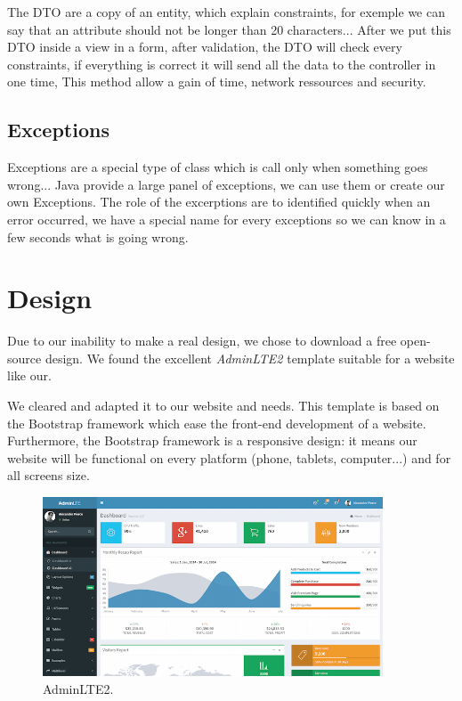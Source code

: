 The DTO are a copy of an entity, which explain constraints, for exemple we can say that an attribute should not be longer than 20 characters...
After we put this DTO inside a view in a form, after validation, the DTO will check every constraints, if everything is correct it will send all the data to the controller in one time,
This method allow a gain of time, network ressources and security.

\subsection{Exceptions}

Exceptions are a special type of class which is call only when something goes wrong...
Java provide a large panel of exceptions, we can use them or create our own Exceptions.
The role of the excerptions are to identified quickly when an error occurred, we have a special name for every exceptions so we can know in a few seconds what is going wrong.


\section{Design}
Due to our inability to make a real design, we chose to download a free open-source design. We found the excellent \textit{AdminLTE2} template suitable for a website like our.
\newline

We cleared and adapted it to our website and needs.
This template is based on the Bootstrap framework which ease the front-end development of a website. Furthermore, the Bootstrap framework is a responsive design: it means our website will be functional on every platform (phone, tablets, computer...) and for all screens size.

\begin{figure}[!ht]
  \caption{AdminLTE2.}
  \centering
    \includegraphics[width=0.9\textwidth]{img/design.png}
\end{figure}





